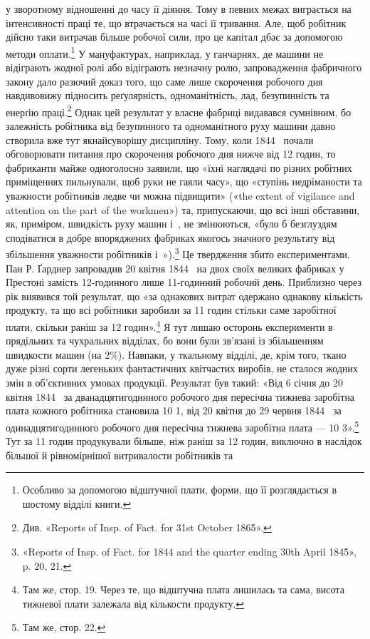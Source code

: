\parcont{}  %
у зворотному відношенні до часу її діяння. Тому в певних межах
виграється на інтенсивності праці те, що втрачається на часі її
тривання. Але, щоб робітник дійсно таки витрачав більше робочої
сили, про це капітал дбає за допомогою методи оплати.\footnote{
Особливо за допомогою відштучної плати, форми, що її розглядається
в шостому відділі книги.
} У мануфактурах,
наприклад, у ганчарнях, де машини не відіграють
жодної ролі або відіграють незначну ролю, запровадження фабричного
закону дало разючий доказ того, що саме лише скорочення
робочого дня навдивовижу підносить реґулярність, одноманітність,
лад, безупинність та енерґію праці.\footnote{
Див. «Reports of Insp. of Fact. for 31st October 1865».
} Однак цей результат
у власне фабриці видавався сумнівним, бо залежність робітника
від безупинного та одноманітного руху машини давно створила
вже тут якнайсуворішу дисципліну. Тому, коли 1844~
почали обговорювати питання про скорочення робочого дня
нижче від 12 годин, то фабриканти майже одноголосно заявили,
що «їхні наглядачі по різних робітних приміщеннях пильнували,
щоб руки не гаяли часу», що «ступінь недріманости та уважности
робітників ледве чи можна підвищити» («the extent of vigilance
and attention on the part of the workmen») та, припускаючи, що всі
інші обставини, як, приміром, швидкість руху машин і~,
не змінюються, «було б безглуздям сподіватися в добре впоряджених
фабриках якогось значного результату від збільшення
уважности робітників і~»).\footnote{
«Reports of Insp. of Fact. for 1844 and the quarter ending 30th
April 1845», p. 20, 21.
} Це твердження збито експериментами.
Пан Р. Ґарднер запровадив 20 квітня 1844~ на двох
своїх великих фабриках у Престоні замість 12-годинного лише
11-годинний робочий день. Приблизно через рік виявився
той результат, що «за однакових витрат одержано однакову
кількість продукту, та що всі робітники заробили за 11 годин
стільки саме заробітної плати, скільки раніш за 12 годин».\footnote{
Там же, стор. 19. Через те, що відштучна плата лишилась та
сама, висота тижневої плати залежала від кількости продукту.
}
Я тут лишаю осторонь експерименти в прядільних та чухральних
відділах, бо вони були зв’язані із збільшенням швидкости машин
(на 2\%). Навпаки, у ткальному відділі, де, крім того, ткано
дуже різні сорти легеньких фантастичних квітчастих виробів,
не сталося жодних змін в об’єктивних умовах продукції. Результат
був такий: «Від 6 січня до 20 квітня 1844~ за дванадцятигодинного
робочого дня пересічна тижнева заробітна плата кожного
робітника становила 10 1, від 20 квітня до
29 червня 1844~ за одинадцятигодинного робочого дня пересічна
тижнева заробітна плата — 10 3».\footnote{
Там же, стор. 22.
} Тут за
11 годин продукували більше, ніж раніш за 12 годин, виключно
в наслідок більшої й рівномірнішої витривалости робітників та
\parbreak{}  %
